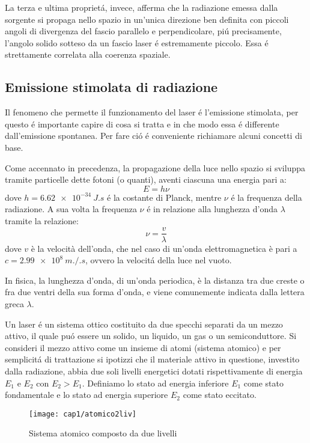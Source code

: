 La terza e ultima propriet\'a, invece, afferma che la radiazione emessa dalla sorgente si propaga nello spazio in un'unica direzione ben definita con piccoli angoli di divergenza del fascio parallelo e perpendicolare, pi\'u precisamente, l'angolo solido sotteso da un fascio laser \'e estremamente piccolo. Essa \'e strettamente correlata alla coerenza spaziale.


\subsection{Emissione stimolata di radiazione}
Il fenomeno che permette il funzionamento del laser \'e l'emissione stimolata, per questo \'e importante capire di cosa si tratta e in che modo essa \'e differente dall'emissione spontanea. Per fare ci\'o \'e conveniente richiamare alcuni concetti di base.

Come accennato in precedenza, la propagazione della luce nello spazio si sviluppa tramite particelle dette fotoni (o quanti), aventi ciascuna una energia pari a:
\begin{equation}
E=h\nu
\end{equation}
dove $h= \SI{6.62e-34}{J.s}$ \'e la costante di Planck, mentre $\nu$ \'e la frequenza della radiazione. A sua volta la frequenza $\nu$ \'e in relazione alla lunghezza d'onda $\lambda$ tramite la relazione:
\begin{equation}
\nu= \frac{v}{\lambda}
\end{equation}
dove $v$ è la velocità dell'onda, che nel caso di un'onda elettromagnetica è pari a $c= \SI{2.99e8}{m.\per.s}$, ovvero la velocit\'a della luce nel vuoto. 

In fisica, la lunghezza d'onda, di un'onda periodica, è la distanza tra due creste o fra due ventri della sua forma d'onda, e viene comunemente indicata dalla lettera greca $\lambda$.

Un laser \'e un sistema ottico costituito da due specchi separati da un mezzo attivo, il quale pu\'o essere un solido, un liquido, un gas o un semiconduttore. Si consideri il mezzo attivo come un insieme di atomi (sistema atomico) e per semplicit\'a di trattazione si ipotizzi che il materiale attivo in questione, investito dalla radiazione, abbia due soli livelli energetici dotati rispettivamente di energia $E_{1}$ e $E_{2}$ con $E_{2}>E_{1}$. Definiamo lo stato ad energia inferiore $E_{1}$ come stato fondamentale e lo stato ad energia superiore $E_{2}$ come stato eccitato.
\begin{figure}[H]
  \begin{center}
    \texttt{[image: cap1/atomico2liv]}
    \caption{Sistema atomico composto da due livelli}
    \label{atomico2liv}
  \end{center}
\end{figure}

